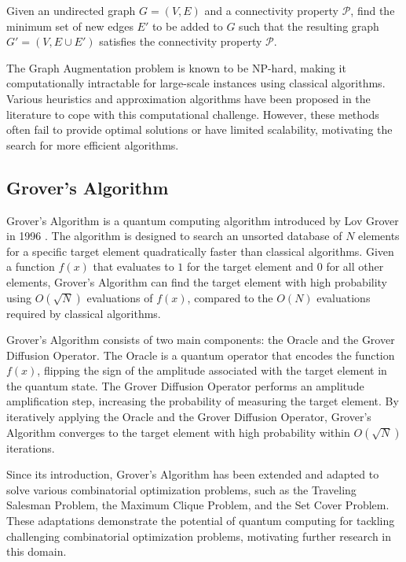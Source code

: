 \begin{definition}
Given an undirected graph $G = (V, E)$ and a connectivity property $\mathcal{P}$, find the minimum set of new edges $E'$ to be added to $G$ such that the resulting graph $G' = (V, E \cup E')$ satisfies the connectivity property $\mathcal{P}$.
\end{definition}

The Graph Augmentation problem is known to be NP-hard, making it computationally intractable for large-scale instances using classical algorithms. Various heuristics and approximation algorithms have been proposed in the literature to cope with this computational challenge. However, these methods often fail to provide optimal solutions or have limited scalability, motivating the search for more efficient algorithms.

\subsection{Grover's Algorithm}
\label{subsec:grover_algorithm}

Grover's Algorithm is a quantum computing algorithm introduced by Lov Grover in 1996 \cite{grover1996fast}. The algorithm is designed to search an unsorted database of $N$ elements for a specific target element quadratically faster than classical algorithms. Given a function $f(x)$ that evaluates to $1$ for the target element and $0$ for all other elements, Grover's Algorithm can find the target element with high probability using $O(\sqrt{N})$ evaluations of $f(x)$, compared to the $O(N)$ evaluations required by classical algorithms.

Grover's Algorithm consists of two main components: the Oracle and the Grover Diffusion Operator. The Oracle is a quantum operator that encodes the function $f(x)$, flipping the sign of the amplitude associated with the target element in the quantum state. The Grover Diffusion Operator performs an amplitude amplification step, increasing the probability of measuring the target element. By iteratively applying the Oracle and the Grover Diffusion Operator, Grover's Algorithm converges to the target element with high probability within $O(\sqrt{N})$ iterations.

Since its introduction, Grover's Algorithm has been extended and adapted to solve various combinatorial optimization problems, such as the Traveling Salesman Problem, the Maximum Clique Problem, and the Set Cover Problem. These adaptations demonstrate the potential of quantum computing for tackling challenging combinatorial optimization problems, motivating further research in this domain.

